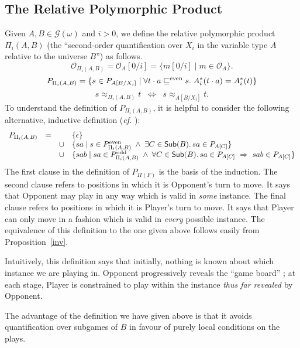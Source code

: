 \documentclass[a4paper,11pt]{article}
\newcommand{\gequiv}{\approx}
\newcommand{\GG}[1]{\mathcal{G}(#1)}
\newcommand{\Occ}{\mathcal{O}}
\newcommand{\SubB}{\mathsf{Sub}(B)}
\begin{document}
\subsection{The Relative Polymorphic Product}
Given $A, B \in \GG{\omega}$ and $i > 0$, we define the relative
polymorphic product $\Pi_{i} (A, B)$ (the ``second-order quantification over $X_i$ in the
variable type $A$ relative to the universe $B$'') as follows.
\[ \Occ_{\Pi_{i}(A, B)} = \Occ_{A}[0/i] = \{ m[0/i] \mid m \in \Occ_{A} \} . \]
\[
P_{\Pi_{i}(A, B)} = \{ s \in P_{A[B/X_{i}]}  \mid  \forall t \cdot a
\sqsubseteq^{\mbox{{\scriptsize even}}} s.  \;
A_{i}^{\ast}(t \cdot a) = A_{i}^{\ast}(t) \}
\]
\[ s \gequiv_{\Pi_{i}(A, B)} t \;\; \Longleftrightarrow \;\; s
\gequiv_{A[B/X_{i}]} t . \]
To understand the definition of $P_{\Pi_{i}(A, B)}$, it is helpful to
consider the following alternative, inductive definition (\textit{cf.}
\cite{Abr96}):
\[ \begin{array}{llll}
P_{\Pi_{i}(A, B)} &=& & \{\epsilon\} \\
 & & \cup & \{ sa \mid s\in P_{\Pi_{i}(A, B)}^{\mbox{{\scriptsize even}}} \; \wedge\; \exists C \in \SubB . \,
sa\in P_{A[C]} \}\\
        & & \cup & \{ sab \mid sa\in  P_{\Pi_{i}(A, B)}^{\mbox{{\scriptsize
       odd}}} \;
\wedge \; \forall C \in \SubB .\, sa\in P_{A[C]}\ \Rightarrow \ sab\in P_{A[C]}
 \}
\end{array}
\]
The first clause in the definition of $P_{\Pi(F)}$
is the basis of the induction.
The second clause refers to positions in which it is Opponent's turn to move.
It says that Opponent may play in any way which is valid in {\em some}
instance. The final clause refers
to positions in which it is Player's turn to move.
It says that Player can only move in a fashion which is valid in {\em every}
possible instance. The equivalence of this definition to the one given
above follows easily from Proposition~\ref{inv}.

Intuitively, this definition says that initially, nothing is known about which instance we are playing in.
Opponent progressively reveals the ``game board'' ;
at each stage, Player is constrained to play within the instance
{\em thus far revealed} by Opponent.

The advantage of the definition we have given above is that it avoids
quantification over subgames of $B$ in favour of purely local
conditions on the plays.
\end{document}
